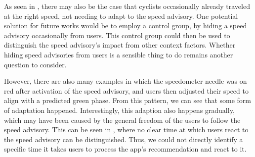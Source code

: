 As seen in , there may also be the case that cyclists occasionally already traveled at the right speed, not needing to adapt to the speed advisory. One potential solution for future works would be to employ a control group, by hiding a speed advisory occasionally from users. This control group could then be used to distinguish the speed advisory's impact from other context factors. Whether hiding speed advisories from users is a sensible thing to do remains another question to consider.

However, there are also many examples in which the speedometer needle was on red after activation of the speed advisory, and users then adjusted their speed to align with a predicted green phase. From this pattern, we can see that some form of adaptation happened. Interestingly, this adaption also happens gradually, which may have been caused by the general freedom of the users to follow the speed advisory. This can be seen in , where no clear time at which users react to the speed advisory can be distinguished. Thus, we could not directly identify a specific time it takes users to process the app's recommendation and react to it.

